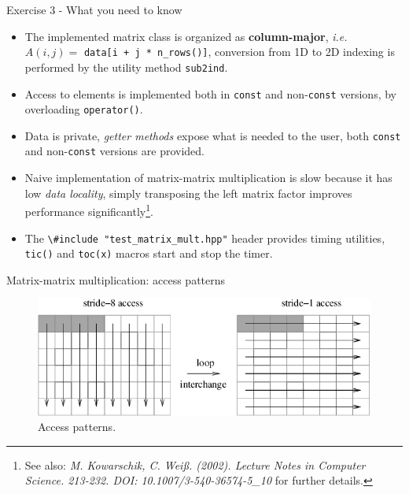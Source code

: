 \documentclass[10pt]{beamer}
\begin{document}
\begin{frame}{Exercise 3 - What you need to know}
\begin{itemize}
\item The implemented matrix class is organized as
      \textbf{column-major}, \textit{i.e.}
      $A(i, j) = $ \lstinline{data[i + j * n_rows()]},
      conversion from 1D to 2D indexing is performed by the utility
      method \lstinline{sub2ind}.\\[3mm]
\item Access to elements is implemented both in \texttt{const} and non-\texttt{const} versions, by overloading \lstinline{operator()}. \\[3mm]
\item Data is private, \textit{getter methods} expose what is needed to the user, both \texttt{const} and non-\texttt{const} versions are provided. \\[3mm]
\item Naive implementation of matrix-matrix multiplication is slow because it has low \textit{data locality}, simply transposing the left matrix factor improves performance significantly\footnote{See also: \textit{M. Kowarschik, C. Weiß. (2002). Lecture Notes in Computer Science. 213-232. DOI: 10.1007/3-540-36574-5\_10} for further details.}.\\[3mm]
\item The \lstinline{\#include "test_matrix_mult.hpp"} header provides timing utilities, \lstinline{tic()} and \lstinline{toc(x)} macros start and stop the timer.
\end{itemize}
\end{frame}

\begin{frame}{Matrix-matrix multiplication: access patterns}
    \begin{figure}
        \centering
        \includegraphics[width=\textwidth]{images/access_patterns.png}
        \caption{Access patterns.}
    \end{figure}
\end{frame}
\end{document}
